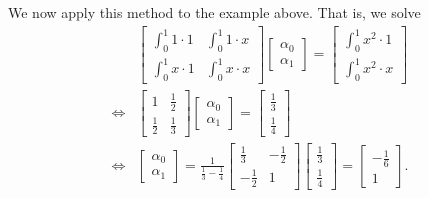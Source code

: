 \documentclass{homework}
\begin{document}
\begin{solution}
  We now apply this method to the example above. That is, we solve
    \renewcommand{\arraystretch}{1.8}
  \begin{align*}
    &\begin{bmatrix}
      \int_0^1 1\cdot1 & \int_0^1 1\cdot x\\
      \int_0^1 x\cdot1 & \int_0^1 x\cdot x
    \end{bmatrix}
    \begin{bmatrix}
      \alpha_0\\
      \alpha_1
    \end{bmatrix}
    =
    \begin{bmatrix}
      \int_0^1 x^2 \cdot 1 \\
      \int_0^1 x^2 \cdot x
    \end{bmatrix}\\
    \iff
    &\begin{bmatrix}
      1 & \frac 12\\
      \frac 12 & \frac 13 
    \end{bmatrix}
    \begin{bmatrix}
      \alpha_0\\
      \alpha_1
    \end{bmatrix}
    =
    \begin{bmatrix}
      \frac 13 \\
      \frac 14
    \end{bmatrix}\\
    \iff
    &\begin{bmatrix}
      \alpha_0\\
      \alpha_1
    \end{bmatrix}
    = \frac{1}{\frac 13-\frac 14}\begin{bmatrix}
      \frac 13 & -\frac 12\\
      -\frac 12 &  1
    \end{bmatrix}
    \begin{bmatrix}
      \frac 13 \\
      \frac 14
    \end{bmatrix}
    =
    \begin{bmatrix}
      -\frac 16 \\
      1
    \end{bmatrix}.\\
  \end{align*}
\end{solution}

\end{document}
